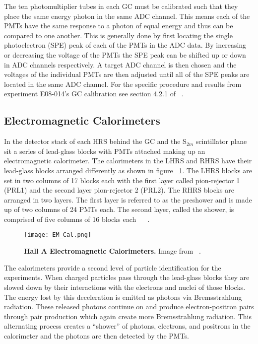 The ten photomultiplier tubes in each GC must be calibrated such that they place the same energy photon in the same ADC channel. This means each of the PMTs have the same response to a photon of equal energy and thus can be compared to one another. This is generally done by first locating the single photoelectron (SPE) peak of each of the PMTs in the ADC data. By increasing or decreasing the voltage of the PMTs the SPE peak can be shifted up or down in ADC channels respectively. A target ADC channel is then chosen and the voltages of the individual PMTs are then adjusted until all of the SPE peaks are located in the same ADC channel. For the specific procedure and results from experiment E08-014's GC calibration see section 4.2.1 of ~\cite{Thesis:Ye}.

\subsection{Electromagnetic Calorimeters}
\label{ssec:em_cal}

In the detector stack of each HRS behind the GC and the S$_{2m}$ scintillator plane sit a series of lead-glass blocks with PMTs attached making up an electromagnetic calorimeter. The calorimeters in the LHRS and RHRS have their lead-glass blocks arranged differently as shown in figure ~\ref{fig:em_cal}. The LHRS blocks are set in two columns of 17 blocks each with the first layer called pion-rejector 1 (PRL1) and the second layer pion-rejector 2 (PRL2). The RHRS blocks are arranged in two layers. The first layer is referred to as the preshower and is made up of two columns of 24 PMTs each. The second layer, called the shower, is comprised of five columns of 16 blocks each ~\cite{Thesis:Ye} ~\cite{Article:HallA}. 

\begin{figure}[!ht]
\begin{center}
\texttt{[image: EM\_Cal.png]}
\end{center}
\caption{
{\bf{Hall A Electromagnetic Calorimeters.}} Image from ~\cite{Article:HallA}.}
\label{fig:em_cal}
\end{figure}

The calorimeters provide a second level of particle identification for the experiments. When charged particles pass through the lead-glass blocks they are slowed down by their interactions with the electrons and nuclei of those blocks. The energy lost by this deceleration is emitted as photons via Bremsstrahlung radiation. These released photons continue on and produce electron-positron pairs through pair production which again create more Bremsstrahlung radiation. This alternating process creates a ``shower'' of photons, electrons, and positrons in the calorimeter and the photons are then detected by the PMTs. 

